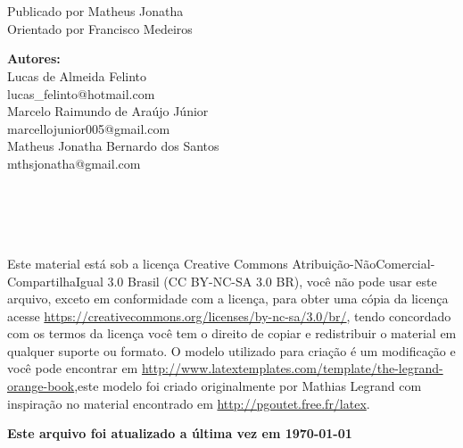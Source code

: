 \newpage
~\vfill
\thispagestyle{empty}

\\ %

{Publicado por Matheus Jonatha}\\ %
{Orientado por Francisco Medeiros} %

{\textbf{Autores:}}\\
{Lucas de Almeida Felinto}\\ %
{lucas\_felinto@hotmail.com}\\
{Marcelo Raimundo de Araújo Júnior}\\ %
{marcellojunior005@gmail.com}\\
{Matheus Jonatha Bernardo dos Santos}\\ %
{mthsjonatha@gmail.com}

\\
\\
\\
\\ %

\noindent Este material está sob a licença Creative Commons Atribuição-NãoComercial-CompartilhaIgual 3.0 Brasil (CC BY-NC-SA 3.0 BR), você não pode usar este arquivo, exceto em conformidade com a licença, para obter uma cópia da licença acesse \url{https://creativecommons.org/licenses/by-nc-sa/3.0/br/}, tendo concordado com os termos da licença você tem o direito de copiar e redistribuir o material em qualquer suporte ou formato. O modelo utilizado para criação é um modificação e você pode encontrar em \url{http://www.latextemplates.com/template/the-legrand-orange-book},este modelo foi criado originalmente por Mathias Legrand com inspiração no material encontrado em \url{http://pgoutet.free.fr/latex}.

\vspace{1cm}
\noindent \textbf{Este arquivo foi atualizado a última vez em \today}
